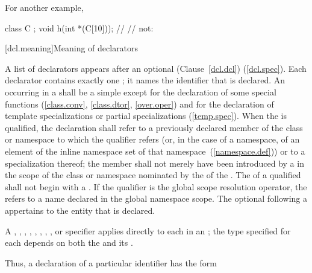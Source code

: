 For another example,

\begin{codeblock}
class C { };
void h(int *(C[10]));           // 
                                // not: 
\end{codeblock}
\exitexample

[dcl.meaning]{Meaning of declarators}%

\pnum
A list of declarators appears after an optional (Clause~\ref{dcl.dcl})
(\ref{dcl.spec}).
%
Each declarator contains exactly one
;
it names the identifier that is declared.
An
occurring in
a
shall be a simple
except for the declaration of some special functions
(\ref{class.conv}, \ref{class.dtor}, \ref{over.oper}) and
for the declaration of template specializations
or partial specializations (\ref{temp.spec}).
When the
is qualified, the declaration shall refer to a previously declared member
of the class or namespace to which the qualifier refers (or,
in the case of a namespace,
of an element of the inline namespace
set of that namespace~(\ref{namespace.def})) or to a specialization thereof; the member
shall not merely have been introduced by a
in the scope of the class or namespace nominated by the
of the
.
The  of a qualified  shall not
begin with a .
\enternote
If the qualifier is the global
\tcode{::}
scope resolution operator, the
refers to a name declared in the global namespace scope.
\exitnote
The optional  following a  appertains to the entity that is declared.

\pnum
A
,
,
,
,
,
,
,
,
or
specifier applies directly to each
in an
;
the type specified for each
depends on both the
and its
.

\pnum
Thus, a declaration of a particular identifier has the form

